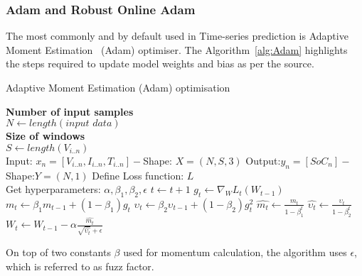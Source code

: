\subsubsection{Adam and Robust Online Adam}
The most commonly and by default used in Time-series prediction is Adaptive Moment Estimation~\cite{kingma_adam_2017} (Adam) optimiser.
The \mbox{Algorithm~\ref{alg:Adam}} highlights the steps required to update model weights and bias as per the source.
\begin{algorithm}
  \caption{Adaptive Moment Estimation (Adam) optimisation}
  \begin{algorithmic}[1]
    \STATE \textbf{Number of input samples} \\ $N\gets length(\textit{input data})$\\
    \STATE \textbf{Size of windows} \\ $S\gets length(V_{i..n})$\\
    \STATE Input: $x_n = [V_{i..n}, I_{i..n}, T_{i..n}] - $Shape: $X = (N, S, 3)$
    \STATE Output:$y_n = [SoC_{n}] - $Shape:$Y = (N, 1)$
    \STATE Define Loss function: $L$ \\
           Get hyperparameters: $\alpha, \beta_1, \beta_2, \epsilon$
    \STATE $t \gets t+1$
    \STATE $g_t \gets \nabla_W L_t (W_{t-1})$ 
    \STATE $m_t \gets \beta_1 m_{t-1}+(1-\beta_1) g_t $ 
    \STATE $\upsilon_t \gets \beta_2 \upsilon_{t-1}+ \left(1-\beta_2 \right)g^2_t $ 
    \STATE $\hat{m_t} \gets \frac{m_t}{1-\beta^t_1}$ 
    \STATE $\hat{\upsilon_t} \gets \frac{\upsilon_t}{1-\beta^t_2} $ 
    \STATE $W_t \gets W_{t-1}- \alpha \frac{\hat{m_t}}{\sqrt{\hat{\upsilon_t}}+\epsilon} $ 
    \ENDWHILE
  \end{algorithmic}
  \label{alg:Adam}
\end{algorithm}
On top of two constants $\beta$ used for momentum calculation, the algorithm uses $\epsilon$, which is referred to as fuzz factor.

